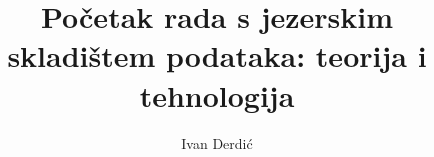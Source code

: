 \documentclass[times, utf8, seminar, numeric]{fer}
\begin{document}
\title{Početak rada s jezerskim skladištem podataka: teorija i tehnologija}

\author{Ivan Derdić}


\maketitle

\tableofcontents















\end{document}
